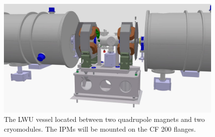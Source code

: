 \begin{figure}[ht]
	\includegraphics[width=\textwidth]{03_Prototype/figures/fig016_LWU_Cryo.jpeg}
	\caption[The LWU vessel located between two quadrupole magnets and two cryomodules]{The LWU vessel located between two quadrupole magnets and two cryomodules. The IPMs will be mounted on the CF 200 flanges. \color{red}{[Changer l'image car elle n'est pas à jours ...]}}
	\label{chap3:LWU_Cryo}
\end{figure}
